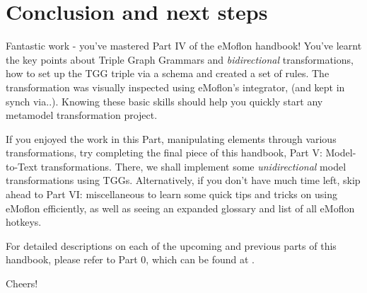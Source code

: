 \section{Conclusion and next steps}
\genHeader

\vspace{0.5cm}

Fantastic work - you've mastered Part IV of the eMoflon handbook! You've learnt the key points about Triple Graph Grammars and \emph{bidirectional}
transformations, how to set up the TGG triple via a schema and created a set of rules. The transformation was visually inspected using eMoflon's integrator,
(and kept in synch via..). Knowing these basic skills should help you quickly start any metamodel transformation project.

If you enjoyed the work in this Part, manipulating elements through various transformations, try completing the final piece of this handbook, Part V:
Model-to-Text transformations. There, we shall implement some \emph{unidirectional} model transformations using TGGs. Alternatively, if you don't have much time
left, skip ahead to Part VI: miscellaneous to learn some quick tips and tricks on using eMoflon efficiently, as well as seeing an expanded glossary and list of
all eMoflon hotkeys.

For detailed descriptions on each of the upcoming and previous parts of this handbook, please refer to Part 0, which can be found at \dlPartZero.

Cheers!
